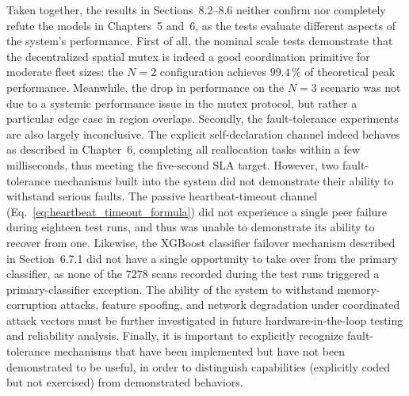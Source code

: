 Taken together, the results in Sections~8.2--8.6 neither confirm nor completely refute the models in Chapters~5 and~6, as the tests evaluate different aspects of the system's performance. First of all, the nominal scale tests demonstrate that the decentralized spatial mutex is indeed a good coordination primitive for moderate fleet sizes: the $N=2$ configuration achieves $99.4\,\%$ of theoretical peak performance. Meanwhile, the drop in performance on the $N=3$ scenario was not due to a systemic performance issue in the mutex protocol, but rather a particular edge case in region overlaps. Secondly, the fault-tolerance experiments are also largely inconclusive. The explicit self-declaration channel indeed behaves as described in Chapter~6, completing all reallocation tasks within a few milliseconds, thus meeting the five-second SLA target. However, two fault-tolerance mechanisms built into the system did not demonstrate their ability to withstand serious faults. The passive heartbeat-timeout channel (Eq.~\eqref{eq:heartbeat_timeout_formula}) did not experience a single peer failure during eighteen test runs, and thus was unable to demonstrate its ability to recover from one. Likewise, the XGBoost classifier failover mechanism described in Section~6.7.1 did not have a single opportunity to take over from the primary classifier, as none of the $7278$ scans recorded during the test runs triggered a primary-classifier exception. The ability of the system to withstand memory-corruption attacks, feature spoofing, and network degradation under coordinated attack vectors must be further investigated in future hardware-in-the-loop testing and reliability analysis. Finally, it is important to explicitly recognize fault-tolerance mechanisms that have been implemented but have not been demonstrated to be useful, in order to distinguish capabilities (explicitly coded but not exercised) from demonstrated behaviors.

